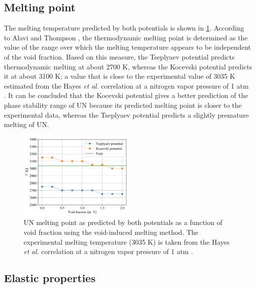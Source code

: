 \documentclass[preprint, 12pt]{elsarticle}
\begin{document}
\subsection{Melting point}

The melting temperature predicted by both potentials is shown in \cref{Fig:Tm}. According to Alavi and Thompson \cite{Alavi2006}, the thermodynamic melting point is determined as the value of the range over which the melting temperature appears to be independent of the void fraction. Based on this measure, the Tseplyaev potential predicts thermodynamic melting at about 2700 K, whereas the Kocevski potential predicts it at about 3100 K; a value that is close to the experimental value of 3035 K estimated from the Hayes \textit{et al.} correlation at a nitrogen vapor pressure of 1 atm \cite{Hayes1990IV}. It can be concluded that the Kocevski potential gives a better prediction of the phase stability range of UN because its predicted melting point is closer to the experimental data, whereas the Tseplyaev potential predicts a slightly premature melting of UN.

\begin{figure}[h!]
\centering
\includegraphics[width=0.5\textwidth]{Tm.png}
\caption{UN melting point as predicted by both potentials as a function of void fraction using the void-induced melting method. The experimental melting temperature (3035 K) is taken from the Hayes \textit{et al.} correlation at a nitrogen vapor pressure of 1 atm \cite{Hayes1990IV}.}
\label{Fig:Tm}
\end{figure}



\subsection{Elastic properties}
\label{Sec:Elastic}
\end{document}
